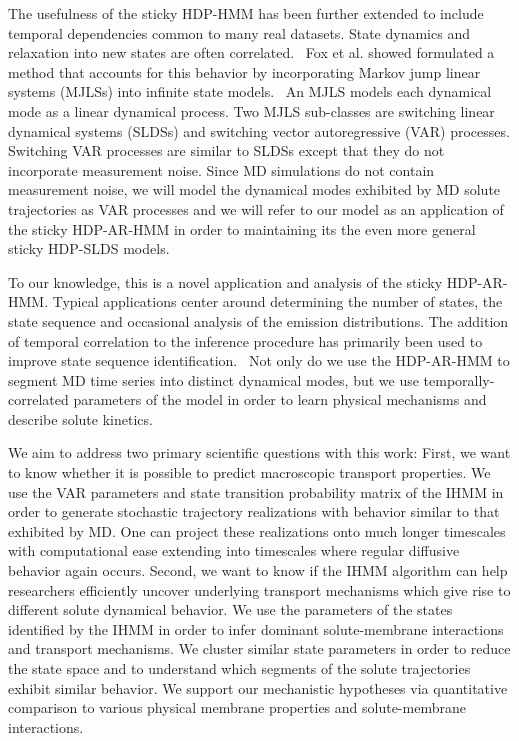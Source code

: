 \documentclass[journal=jpcbfk,manuscript=article]{achemso}
\begin{document}
  The usefulness of the sticky HDP-HMM has been further extended to include 
  temporal dependencies common to many real datasets. State dynamics and 
  relaxation into new states are often correlated.~\cite{calderon_data-driven_2014}
  Fox et al. showed formulated a method that accounts for this behavior by
  incorporating Markov jump linear systems (MJLSs) into infinite state 
  models.~\cite{fox_nonparametric_2009} An MJLS models each dynamical mode
  as a linear dynamical process. Two MJLS sub-classes are switching linear
  dynamical systems (SLDSs) and switching vector autoregressive (VAR) processes.
  Switching VAR processes are similar to SLDSs except that they do not
  incorporate measurement noise. Since MD simulations do not contain measurement
  noise, we will model the dynamical modes exhibited by MD solute trajectories 
  as VAR processes and we will refer to our model as an application of the 
  sticky HDP-AR-HMM in order to maintaining its the even more general sticky
  HDP-SLDS models.
  
  To our knowledge, this is a novel application and analysis of the sticky 
  HDP-AR-HMM. Typical applications center around determining the number of
  states, the state sequence and occasional analysis of the emission 
  distributions. The addition of temporal correlation to the inference 
  procedure has primarily been used to improve state sequence 
  identification.~\cite{calderon_inferring_2015,hamada_modeling_2016}
  Not only do we use the HDP-AR-HMM to segment MD time series into distinct
  dynamical modes, but we use temporally-correlated parameters of the model
  in order to learn physical mechanisms and describe solute kinetics. 
  
  We aim to address two primary scientific questions with this work:
  First, we want to know whether it is possible to predict macroscopic transport
  properties. We use the VAR parameters and state transition probability matrix of
  the IHMM in order to generate stochastic trajectory realizations with behavior 
  similar to that exhibited by MD. One can project these realizations onto much 
  longer timescales with computational ease extending into timescales where 
  regular diffusive behavior again occurs.
  Second, we want to know if the IHMM algorithm can help researchers
  efficiently uncover underlying transport mechanisms which give rise to different 
  solute dynamical behavior.
  We use the parameters of the states identified by the IHMM in order to infer 
  dominant solute-membrane interactions and transport mechanisms. We cluster similar 
  state parameters in order to reduce the state space and to understand which segments 
  of the solute trajectories exhibit similar behavior. We support our mechanistic 
  hypotheses via quantitative comparison to various physical membrane properties and
  solute-membrane interactions.
  
\end{document}

